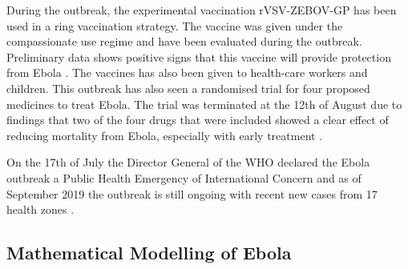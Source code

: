 \documentclass[12pt]{article}
\begin{document}
During the outbreak, the experimental vaccination rVSV-ZEBOV-GP has been used in a ring vaccination strategy. The vaccine was given under the compassionate use regime and have been evaluated during the outbreak. Preliminary data shows positive signs that this vaccine will provide protection from Ebola \cite{organizationPreliminaryResultsEfficacy2019}. The vaccines has also been given to health-care workers and children. This outbreak has also seen a randomised trial for four proposed medicines to treat Ebola. The trial was terminated at the 12th of August due to findings that two of the four drugs that were included showed a clear effect of reducing mortality from Ebola, especially with early treatment \cite{nationalinstituteofallergyandinfectiousdiseasesIndependentMonitoringBoard2019}.

On the 17th of July the Director General of the WHO declared the Ebola outbreak a Public Health Emergency of International Concern \cite{worldhealthorganizationEbolaOutbreakDRC2019} and as of September 2019 the outbreak is still ongoing with recent new cases from 17 health zones \cite{worldhealthorganizationEbolaOutbreakDRC2019b}. 

\subsection{Mathematical Modelling of Ebola}
\end{document}
